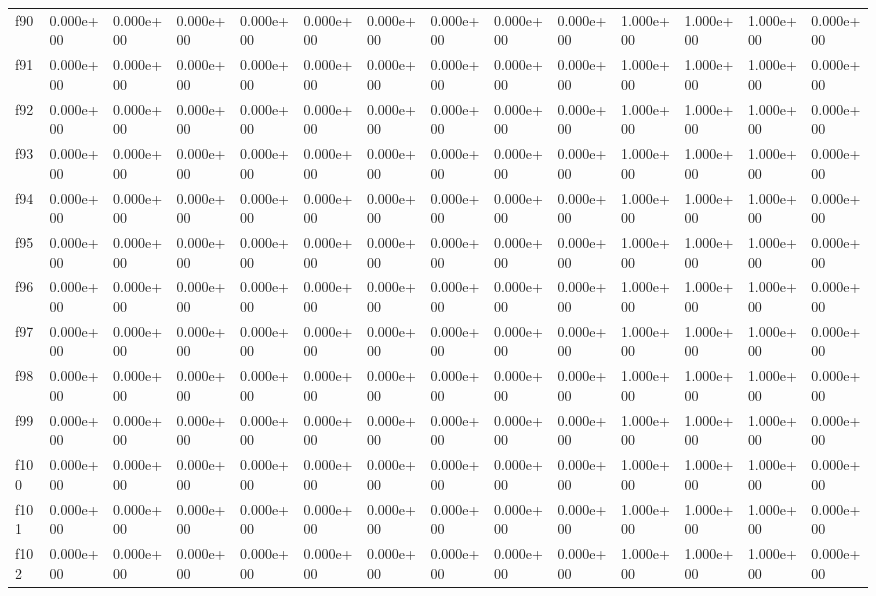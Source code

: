 \begin{table}
\begin{tabular}{llllllllllllll}
f90 & 0.000e+00 & 0.000e+00 & 0.000e+00 & 0.000e+00 & 0.000e+00 & 0.000e+00 & 0.000e+00 & 0.000e+00 & 0.000e+00 & 1.000e+00 & 1.000e+00 & 1.000e+00 & 0.000e+00 \\
f91 & 0.000e+00 & 0.000e+00 & 0.000e+00 & 0.000e+00 & 0.000e+00 & 0.000e+00 & 0.000e+00 & 0.000e+00 & 0.000e+00 & 1.000e+00 & 1.000e+00 & 1.000e+00 & 0.000e+00 \\
f92 & 0.000e+00 & 0.000e+00 & 0.000e+00 & 0.000e+00 & 0.000e+00 & 0.000e+00 & 0.000e+00 & 0.000e+00 & 0.000e+00 & 1.000e+00 & 1.000e+00 & 1.000e+00 & 0.000e+00 \\
f93 & 0.000e+00 & 0.000e+00 & 0.000e+00 & 0.000e+00 & 0.000e+00 & 0.000e+00 & 0.000e+00 & 0.000e+00 & 0.000e+00 & 1.000e+00 & 1.000e+00 & 1.000e+00 & 0.000e+00 \\
f94 & 0.000e+00 & 0.000e+00 & 0.000e+00 & 0.000e+00 & 0.000e+00 & 0.000e+00 & 0.000e+00 & 0.000e+00 & 0.000e+00 & 1.000e+00 & 1.000e+00 & 1.000e+00 & 0.000e+00 \\
f95 & 0.000e+00 & 0.000e+00 & 0.000e+00 & 0.000e+00 & 0.000e+00 & 0.000e+00 & 0.000e+00 & 0.000e+00 & 0.000e+00 & 1.000e+00 & 1.000e+00 & 1.000e+00 & 0.000e+00 \\
f96 & 0.000e+00 & 0.000e+00 & 0.000e+00 & 0.000e+00 & 0.000e+00 & 0.000e+00 & 0.000e+00 & 0.000e+00 & 0.000e+00 & 1.000e+00 & 1.000e+00 & 1.000e+00 & 0.000e+00 \\
f97 & 0.000e+00 & 0.000e+00 & 0.000e+00 & 0.000e+00 & 0.000e+00 & 0.000e+00 & 0.000e+00 & 0.000e+00 & 0.000e+00 & 1.000e+00 & 1.000e+00 & 1.000e+00 & 0.000e+00 \\
f98 & 0.000e+00 & 0.000e+00 & 0.000e+00 & 0.000e+00 & 0.000e+00 & 0.000e+00 & 0.000e+00 & 0.000e+00 & 0.000e+00 & 1.000e+00 & 1.000e+00 & 1.000e+00 & 0.000e+00 \\
f99 & 0.000e+00 & 0.000e+00 & 0.000e+00 & 0.000e+00 & 0.000e+00 & 0.000e+00 & 0.000e+00 & 0.000e+00 & 0.000e+00 & 1.000e+00 & 1.000e+00 & 1.000e+00 & 0.000e+00 \\
f100 & 0.000e+00 & 0.000e+00 & 0.000e+00 & 0.000e+00 & 0.000e+00 & 0.000e+00 & 0.000e+00 & 0.000e+00 & 0.000e+00 & 1.000e+00 & 1.000e+00 & 1.000e+00 & 0.000e+00 \\
f101 & 0.000e+00 & 0.000e+00 & 0.000e+00 & 0.000e+00 & 0.000e+00 & 0.000e+00 & 0.000e+00 & 0.000e+00 & 0.000e+00 & 1.000e+00 & 1.000e+00 & 1.000e+00 & 0.000e+00 \\
f102 & 0.000e+00 & 0.000e+00 & 0.000e+00 & 0.000e+00 & 0.000e+00 & 0.000e+00 & 0.000e+00 & 0.000e+00 & 0.000e+00 & 1.000e+00 & 1.000e+00 & 1.000e+00 & 0.000e+00 \\

\end{tabular}
\end{table}
